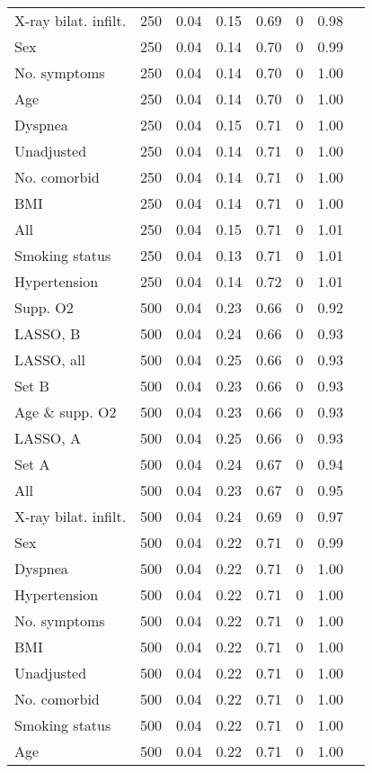 \documentclass{article}
\begin{document}
{\begin{longtable}{lccccccc}
X-ray bilat. infilt. & 250 & 0.04 & 0.15 & 0.69 & 0 & 0.98\\
Sex & 250 & 0.04 & 0.14 & 0.70 & 0 & 0.99\\
No. symptoms & 250 & 0.04 & 0.14 & 0.70 & 0 & 1.00\\
Age & 250 & 0.04 & 0.14 & 0.70 & 0 & 1.00\\
Dyspnea & 250 & 0.04 & 0.15 & 0.71 & 0 & 1.00\\
Unadjusted & 250 & 0.04 & 0.14 & 0.71 & 0 & 1.00\\
No. comorbid & 250 & 0.04 & 0.14 & 0.71 & 0 & 1.00\\
BMI & 250 & 0.04 & 0.14 & 0.71 & 0 & 1.00\\
All & 250 & 0.04 & 0.15 & 0.71 & 0 & 1.01\\
Smoking status & 250 & 0.04 & 0.13 & 0.71 & 0 & 1.01\\
Hypertension & 250 & 0.04 & 0.14 & 0.72 & 0 & 1.01\\ \midrule
Supp. O2 & 500 & 0.04 & 0.23 & 0.66 & 0 & 0.92\\
LASSO, B & 500 & 0.04 & 0.24 & 0.66 & 0 & 0.93\\
LASSO, all & 500 & 0.04 & 0.25 & 0.66 & 0 & 0.93\\
Set B & 500 & 0.04 & 0.23 & 0.66 & 0 & 0.93\\
Age \& supp. O2 & 500 & 0.04 & 0.23 & 0.66 & 0 & 0.93\\
LASSO, A & 500 & 0.04 & 0.25 & 0.66 & 0 & 0.93\\
Set A & 500 & 0.04 & 0.24 & 0.67 & 0 & 0.94\\
All & 500 & 0.04 & 0.23 & 0.67 & 0 & 0.95\\
X-ray bilat. infilt. & 500 & 0.04 & 0.24 & 0.69 & 0 & 0.97\\
Sex & 500 & 0.04 & 0.22 & 0.71 & 0 & 0.99\\
Dyspnea & 500 & 0.04 & 0.22 & 0.71 & 0 & 1.00\\
Hypertension & 500 & 0.04 & 0.22 & 0.71 & 0 & 1.00\\
No. symptoms & 500 & 0.04 & 0.22 & 0.71 & 0 & 1.00\\
BMI & 500 & 0.04 & 0.22 & 0.71 & 0 & 1.00\\
Unadjusted & 500 & 0.04 & 0.22 & 0.71 & 0 & 1.00\\
No. comorbid & 500 & 0.04 & 0.22 & 0.71 & 0 & 1.00\\
Smoking status & 500 & 0.04 & 0.22 & 0.71 & 0 & 1.00\\
Age & 500 & 0.04 & 0.22 & 0.71 & 0 & 1.00\\ \midrule

\end{longtable}}
\end{document}
